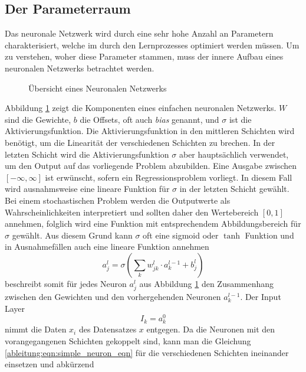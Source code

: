 \subsection{Der Parameterraum}
Das neuronale Netzwerk wird durch eine sehr hohe Anzahl an Parametern charakterisiert, welche im durch den Lernprozesses optimiert werden müssen. Um zu verstehen, woher diese Parameter stammen, muss der innere Aufbau eines neuronalen Netzwerks betrachtet werden.
\begin{figure}
	\begin{center}
		
		\caption{Übersicht eines Neuronalen Netzwerks}
		\label{ableitung:fig:neuronal_network}
	\end{center}
\end{figure} 
Abbildung \ref{ableitung:fig:neuronal_network} zeigt die Komponenten eines einfachen neuronalen Netzwerks. $W$ sind die Gewichte, $b$ die Offsets, oft auch \textit{bias} genannt, und $\sigma$ ist die Aktivierungsfunktion. Die Aktivierungsfunktion in den mittleren Schichten wird benötigt, um die Linearität der verschiedenen Schichten zu brechen. In der letzten Schicht wird die Aktivierungsfunktion $\sigma$ aber hauptsächlich verwendet, um den Output auf das vorliegende Problem abzubilden. Eine Ausgabe zwischen $[-\infty, \infty]$ ist erwünscht, sofern ein Regressionsproblem vorliegt. In diesem Fall wird ausnahmsweise eine lineare Funktion für $\sigma$ in der letzten Schicht gewählt. Bei einem stochastischen Problem werden die Outputwerte als Wahrscheinlichkeiten interpretiert und sollten daher den Wertebereich $[0,1]$ annehmen, folglich wird eine Funktion mit entsprechendem Abbildungsbereich für $\sigma$ gewählt. Aus diesem Grund kann $\sigma$ oft eine  sigmoid oder $\tanh$ Funktion und in Ausnahmefällen auch eine lineare Funktion annehmen
\begin{equation}
a^{l}_{j} = \sigma \left( \sum\limits_{k}w^{l}_{jk} \cdot a^{l-1}_{k}+b^{l}_{j} \right)
\label{ableitung:eqn:simple_neuron_eqn}
\end{equation}
beschreibt somit für jedes Neuron $a^{l}_{j}$ aus Abbildung \ref{ableitung:fig:neuronal_network} den Zusammenhang zwischen den Gewichten und den vorhergehenden Neuronen $a^{l-1}_{k}$. Der Input Layer 
\begin{equation}
I_k = a_{k}^{0}
\end{equation}
nimmt die Daten $x_i$ des Datensatzes $x$ entgegen.
Da die Neuronen mit den vorangegangenen Schichten gekoppelt sind, kann man die Gleichung \eqref{ableitung:eqn:simple_neuron_eqn} für die verschiedenen Schichten ineinander einsetzen und abkürzend
